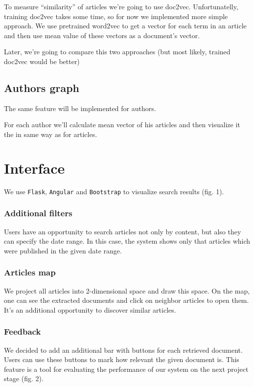To measure ``similarity'' of articles we're going to use doc2vec. 
Unfortunatelly, training doc2vec takes some time, so for now we implemented more simple approach.
We use pretrained word2vec to get a vector for each term in an article and then use mean value of these vectors as a document's vector.

Later, we're going to compare this two approaches (but most likely, trained doc2vec would be better)

\subsection{Authors graph}
The same feature will be implemented for authors. 

For each author we'll calculate mean vector of his articles and then visualize it the in same way as for articles.

\section{Interface}
We use \texttt{Flask}, \texttt{Angular} and \texttt{Bootstrap} to visualize search results (fig. 1).

\subsubsection{Additional filters}
Users have an opportunity to search articles not only by content, but also they can specify the date range. In this case, the system shows only that articles which were published in the given date range.

\subsubsection{Articles map}
We project all articles into 2-dimensional space and draw this space. On the map, one can see the extracted documents and click on neighbor articles to open them. It's an additional opportunity to discover similar articles.  

\subsubsection{Feedback}
We decided to add an additional bar with buttons for each retrieved document. Users can use these buttons to mark how relevant the given document is. This feature is a tool for evaluating the performance of our system on the next project stage (fig. 2).

